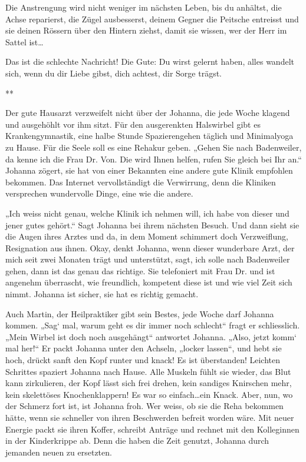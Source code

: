 \documentclass[10pt,titlepage,a5paper]{book}
\newcommand{\sterne}{\par{\centering ***\par}}
\begin{document}
Die Anstrengung wird nicht weniger im nächsten Leben, bis du anhältst, die Achse reparierst, die Zügel ausbesserst, deinem Gegner die Peitsche entreisst und sie deinen Rössern über den Hintern ziehst, damit sie wissen, wer der Herr im Sattel  ist\dots 

Das ist die schlechte Nachricht! Die Gute: Du wirst gelernt haben, alles wandelt sich, wenn du dir Liebe gibst, dich achtest, dir Sorge trägst.

\sterne

Der gute Hausarzt verzweifelt nicht über der Johanna, die jede Woche klagend und ausgehöhlt vor ihm sitzt. Für den ausgerenkten Halswirbel gibt es Krankengymnastik, eine halbe Stunde Spazierengehen täglich und Minimalyoga zu Hause. Für die Seele soll es eine Rehakur geben. „Gehen Sie nach Badenweiler, da kenne ich die Frau Dr. Von. Die wird Ihnen helfen, rufen Sie gleich bei Ihr an.“ Johanna zögert, sie hat von einer Bekannten eine andere gute Klinik empfohlen bekommen. Das Internet vervollständigt die Verwirrung, denn die Kliniken versprechen wundervolle Dinge, eine wie die andere.

„Ich weiss nicht genau, welche Klinik ich nehmen will, ich habe von dieser und jener gutes gehört.“ Sagt  Johanna bei ihrem nächsten Besuch. Und dann sieht sie die Augen ihres Arztes und da, in dem Moment schimmert doch Verzweiflung, Resignation aus ihnen. Okay, denkt Johanna, wenn dieser wunderbare Arzt, der mich seit zwei Monaten trägt und unterstützt, sagt, ich solle nach Badenweiler gehen, dann ist das genau das richtige. Sie telefoniert mit Frau Dr. und ist angenehm überrascht, wie freundlich, kompetent diese ist und wie viel Zeit sich nimmt. Johanna ist sicher, sie hat es richtig gemacht.

Auch Martin, der Heilpraktiker gibt sein Bestes, jede Woche darf Johanna kommen. „Sag` mal, warum geht es dir immer noch schlecht“ fragt er schliesslich. „Mein Wirbel ist doch noch ausgehängt“ antwortet Johanna. „Also, jetzt komm` mal her!“ Er packt Johanna unter den Achseln, „locker lassen“, und hebt sie hoch, drückt sanft den Kopf runter und knack! Es ist überstanden! Leichten Schrittes spaziert Johanna nach Hause. Alle Muskeln fühlt sie wieder, das Blut kann zirkulieren, der Kopf lässt sich frei drehen, kein sandiges Knirschen mehr, kein skelettöses Knochenklappern!
Es war so einfach\dots  ein Knack. Aber, nun, wo der Schmerz fort ist, ist Johanna froh. Wer weiss, ob sie die Reha bekommen hätte, wenn sie schneller von ihren Beschwerden befreit worden wäre. Mit neuer Energie packt sie ihren Koffer, schreibt Anträge und rechnet mit den Kolleginnen in der Kinderkrippe ab. Denn die haben die Zeit genutzt, Johanna durch jemanden neuen zu ersetzten. 
\end{document}
